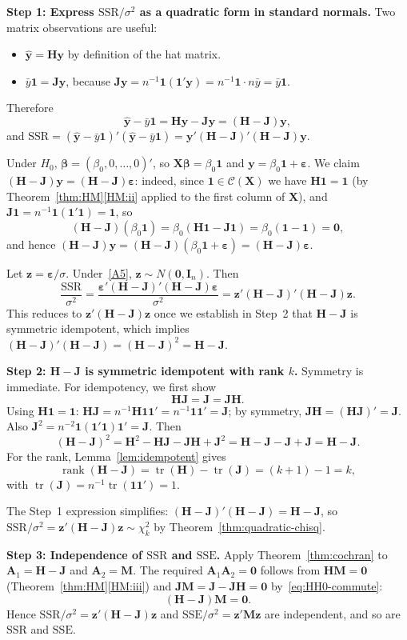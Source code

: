 \documentclass[12pt,a4paper]{article}
\makeatletter
\theoremstyle{definition}
\renewenvironment{proof}[1][\proofname]{\par
  \pushQED{\qed}%
  \normalfont \topsep6\p@\@plus6\p@\relax
  \trivlist
  \item[\hskip\labelsep\bfseries #1\@addpunct{.}]\ignorespaces
}{%
  \popQED\endtrivlist\@endpefalse
}
\DeclareMathOperator\tr{tr}
\DeclareMathOperator\rank{rank}
\newcommand{\SSR}{\mathrm{SSR}}
\newcommand{\SSE}{\mathrm{SSE}}
\newcommand{\bX}{\mathbf{X}}
\newcommand{\by}{\mathbf{y}}
\def\bb{\boldsymbol{\beta}}
\newcommand{\be}{\boldsymbol{\varepsilon}}
\newcommand{\bI}{\mathbf{I}}
\newcommand{\bH}{\mathbf{H}}
\newcommand{\bM}{\mathbf{M}}
\newcommand{\bone}{\mathbf{1}}
\newcommand{\bzero}{\mathbf{0}}
\newcommand{\bz}{\mathbf{z}}
\newcommand{\bA}{\mathbf{A}}
\newcommand{\calC}{\mathcal{C}}
\newcommand{\bJ}{\mathbf{J}}
\makeatother
\begin{document}
\begin{proof}
\textbf{Step 1: Express $\SSR/\sigma^2$ as a quadratic form in standard normals.} Two matrix observations are useful:
\begin{itemize}
\item $\hat{\by} = \bH\by$ by definition of the hat matrix.
\item $\bar{y}\bone = \bJ\by$, because $\bJ\by = n^{-1}\bone(\bone'\by) = n^{-1}\bone \cdot n\bar{y} = \bar{y}\bone$.
\end{itemize}
Therefore
\[
\hat{\by} - \bar{y}\bone = \bH\by - \bJ\by = (\bH - \bJ)\by,
\]
and $\SSR = (\hat{\by} - \bar{y}\bone)'(\hat{\by} - \bar{y}\bone) = \by'(\bH - \bJ)'(\bH - \bJ)\by$.

Under $H_0$, $\bb = (\beta_0, 0, \ldots, 0)'$, so $\bX\bb = \beta_0\bone$ and $\by = \beta_0\bone + \be$. We claim $(\bH - \bJ)\by = (\bH - \bJ)\be$: indeed, since $\bone \in \calC(\bX)$ we have $\bH\bone = \bone$ (by Theorem~\ref{thm:HM}\ref{HM:ii} applied to the first column of $\bX$), and $\bJ\bone = n^{-1}\bone(\bone'\bone) = \bone$, so
\[
(\bH - \bJ)(\beta_0\bone) = \beta_0(\bH\bone - \bJ\bone) = \beta_0(\bone - \bone) = \bzero,
\]
and hence $(\bH - \bJ)\by = (\bH - \bJ)(\beta_0\bone + \be) = (\bH - \bJ)\be$.

Let $\bz = \be/\sigma$. Under~\ref{A5}, $\bz \sim N(\bzero, \bI_n)$. Then
\[
\frac{\SSR}{\sigma^2} = \frac{\be'(\bH - \bJ)'(\bH - \bJ)\be}{\sigma^2} = \bz'(\bH - \bJ)'(\bH - \bJ)\bz.
\]
This reduces to $\bz'(\bH - \bJ)\bz$ once we establish in Step~2 that $\bH - \bJ$ is symmetric idempotent, which implies $(\bH - \bJ)'(\bH - \bJ) = (\bH - \bJ)^2 = \bH - \bJ$.

\textbf{Step 2: $\bH - \bJ$ is symmetric idempotent with rank $k$.} Symmetry is immediate. For idempotency, we first show
\begin{equation}\label{eq:HH0-commute}
\bH\bJ = \bJ = \bJ\bH.
\end{equation}
Using $\bH\bone = \bone$: $\bH\bJ = n^{-1}\bH\bone\bone' = n^{-1}\bone\bone' = \bJ$; by symmetry, $\bJ\bH = (\bH\bJ)' = \bJ$. Also $\bJ^2 = n^{-2}\bone(\bone'\bone)\bone' = \bJ$. Then
\[
(\bH - \bJ)^2 = \bH^2 - \bH\bJ - \bJ\bH + \bJ^2 = \bH - \bJ - \bJ + \bJ = \bH - \bJ.
\]
For the rank, Lemma~\ref{lem:idempotent} gives
\[
\rank(\bH - \bJ) = \tr(\bH) - \tr(\bJ) = (k+1) - 1 = k,
\]
with $\tr(\bJ) = n^{-1}\tr(\bone\bone') = 1$.

The Step~1 expression simplifies: $(\bH - \bJ)'(\bH - \bJ) = \bH - \bJ$, so $\SSR/\sigma^2 = \bz'(\bH - \bJ)\bz \sim \chi^2_k$ by Theorem~\ref{thm:quadratic-chisq}.

\textbf{Step 3: Independence of $\SSR$ and $\SSE$.} Apply Theorem~\ref{thm:cochran} to $\bA_1 = \bH - \bJ$ and $\bA_2 = \bM$. The required $\bA_1\bA_2 = \bzero$ follows from $\bH\bM = \bzero$ (Theorem~\ref{thm:HM}\ref{HM:iii}) and $\bJ\bM = \bJ - \bJ\bH = \bzero$ by~\eqref{eq:HH0-commute}:
\[
(\bH - \bJ)\bM = \bzero.
\]
Hence $\SSR/\sigma^2 = \bz'(\bH - \bJ)\bz$ and $\SSE/\sigma^2 = \bz'\bM\bz$ are independent, and so are $\SSR$ and $\SSE$.
\end{proof}
\end{document}
